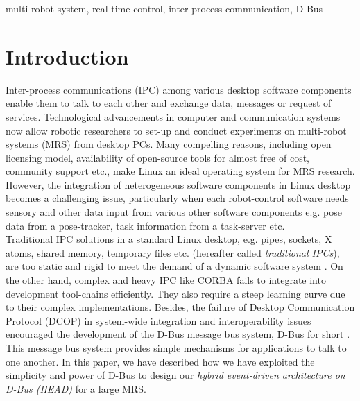 \documentclass{ifacconf}
\begin{document}
\begin{frontmatter}
\begin{keyword}
multi-robot system, real-time control, inter-process communication, D-Bus
\end{keyword}

\end{frontmatter}
\section{Introduction}
Inter-process communications (IPC) among various desktop software components enable them to talk to each other and exchange data, messages or request of services. Technological advancements in computer and communication systems now allow robotic researchers to set-up and conduct experiments on multi-robot systems (MRS) from desktop PCs. Many compelling reasons, including open licensing model, availability of open-source tools for almost free of cost, community support etc., make Linux an ideal operating system for MRS research. However, the integration of heterogeneous software components in Linux desktop becomes a challenging issue, particularly when each robot-control software needs sensory and other data input from various other software components e.g. pose data from a pose-tracker, task information from a task-server etc.\\ 
Traditional IPC solutions in a standard Linux desktop, e.g. pipes, sockets, X atoms, shared memory, temporary files etc. (hereafter called {\em traditional IPCs}), are too static and rigid to meet the demand of a dynamic software system \citep{wittenburg2005}. On the other hand, complex and heavy IPC like CORBA fails to integrate into  development tool-chains efficiently. They also require a steep learning curve due to their complex implementations. Besides, the failure of Desktop Communication Protocol (DCOP) in system-wide integration and interoperability issues encouraged the development of the D-Bus message bus system, D-Bus for short \citep{Pennington+2010}. This message bus system provides simple mechanisms for applications to talk to one another. In this paper, we have described  how we have exploited the simplicity and power of D-Bus  to design our \textit{hybrid event-driven architecture on D-Bus (HEAD)} for a large MRS.\\
\end{document}
